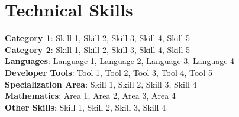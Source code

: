\documentclass[letterpaper,11pt]{article}
\makeatletter
\newcommand{\resumeItem}[1]{
  \item\small{
    {#1 \vspace{-2pt}}
  }
}
\newcommand{\resumeProjectHeading}[2]{
    \item
    \begin{tabular*}{0.97\textwidth}{l@{\extracolsep{\fill}}r}
      \small#1 & #2 \\
    \end{tabular*}\vspace{-7pt}
}
\newcommand{\resumeSubHeadingListStart}{\begin{itemize}[leftmargin=0.15in, label={}]}
\newcommand{\resumeSubHeadingListEnd}{\end{itemize}}
\newcommand{\resumeItemListStart}{\begin{itemize}}
\newcommand{\resumeItemListEnd}{\end{itemize}\vspace{-5pt}}
\makeatother
\begin{document}
\section{Technical Skills}
 \begin{itemize}[leftmargin=0.15in, label={}]
    \small{\item{
     \textbf{Category 1}{: Skill 1, Skill 2, Skill 3, Skill 4, Skill 5} \\
     \textbf{Category 2}{: Skill 1, Skill 2, Skill 3, Skill 4, Skill 5} \\
     \textbf{Languages}{: Language 1, Language 2, Language 3, Language 4} \\
     \textbf{Developer Tools}{: Tool 1, Tool 2, Tool 3, Tool 4, Tool 5} \\
     \textbf{Specialization Area}{: Skill 1, Skill 2, Skill 3, Skill 4} \\
     \textbf{Mathematics}{: Area 1, Area 2, Area 3, Area 4} \\
     \textbf{Other Skills}{: Skill 1, Skill 2, Skill 3, Skill 4}
    }}
 \end{itemize}





\end{document}
